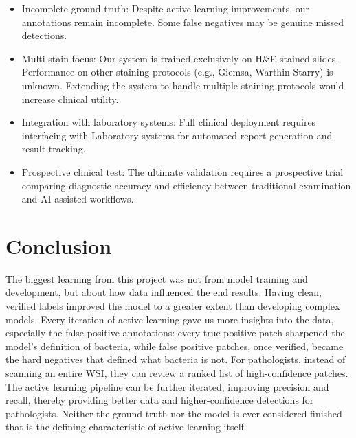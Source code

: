 \documentclass[sigconf, review, nonacm]{acmart}
\begin{document}
\begin{itemize}[leftmargin=*]

\item Incomplete ground truth: Despite active learning improvements, our annotations remain incomplete. Some false negatives may be genuine missed detections.

\item Multi stain focus: Our system is trained exclusively on H\&E-stained slides. Performance on other staining protocols (e.g., Giemsa, Warthin-Starry) is unknown. Extending the system to handle multiple staining protocols would increase clinical utility.

\item Integration with laboratory systems: Full clinical deployment requires interfacing with Laboratory systems for automated report generation and result tracking.

\item Prospective clinical test: The ultimate validation requires a prospective trial comparing diagnostic accuracy and efficiency between traditional examination and AI-assisted workflows.

\end{itemize}

\section{Conclusion}

The biggest learning from this project was not from model training and development, but about how data influenced the end results. Having clean, verified labels improved the model to a greater extent than developing complex models. Every iteration of active learning gave us more insights into the data, especially the false positive annotations: every true positive patch sharpened the model's definition of bacteria, while false positive patches, once verified, became the hard negatives that defined what bacteria is not. For pathologists, instead of scanning an entire WSI, they can review a ranked list of high-confidence patches. The active learning pipeline can be further iterated, improving precision and recall, thereby providing better data and higher-confidence detections for pathologists. Neither the ground truth nor the model is ever considered finished that is the defining characteristic of active learning itself.



\end{document}
